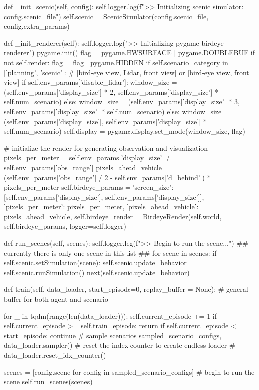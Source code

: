 \begin{appendix}
def \_init\_scenic(self, config):
self.logger.log(f">> Initializing scenic simulator: {config.scenic\_file}")
self.scenic = ScenicSimulator(config.scenic\_file, config.extra\_params)

def \_init\_renderer(self):
self.logger.log(">> Initializing pygame birdeye renderer")
pygame.init()
flag = pygame.HWSURFACE | pygame.DOUBLEBUF
if not self.render:
flag = flag | pygame.HIDDEN
if self.scenario\_category in ['planning', 'scenic']: 
\# [bird-eye view, Lidar, front view] or [bird-eye view, front view]
if self.env\_params['disable\_lidar']:
window\_size = (self.env\_params['display\_size'] * 2, self.env\_params['display\_size'] * self.num\_scenario)
else:
window\_size = (self.env\_params['display\_size'] * 3, self.env\_params['display\_size'] * self.num\_scenario)
else:
window\_size = (self.env\_params['display\_size'], self.env\_params['display\_size'] * self.num\_scenario)
self.display = pygame.display.set\_mode(window\_size, flag)

\# initialize the render for generating observation and visualization
pixels\_per\_meter = self.env\_params['display\_size'] / self.env\_params['obs\_range']
pixels\_ahead\_vehicle = (self.env\_params['obs\_range'] / 2 - self.env\_params['d\_behind']) * pixels\_per\_meter
self.birdeye\_params = {
	'screen\_size': [self.env\_params['display\_size'], self.env\_params['display\_size']],
	'pixels\_per\_meter': pixels\_per\_meter,
	'pixels\_ahead\_vehicle': pixels\_ahead\_vehicle,
}
self.birdeye\_render = BirdeyeRender(self.world, self.birdeye\_params, logger=self.logger)

def run\_scenes(self, scenes):
self.logger.log(f">> Begin to run the scene...")
\#\# currently there is only one scene in this list \#\#
for scene in scenes:
if self.scenic.setSimulation(scene):
self.scenic.update\_behavior = self.scenic.runSimulation()
next(self.scenic.update\_behavior)

def train(self, data\_loader, start\_episode=0, replay\_buffer = None):
\# general buffer for both agent and scenario

for \_ in tqdm(range(len(data\_loader))):
self.current\_episode += 1
if self.current\_episode >= self.train\_episode:
return
if self.current\_episode < start\_episode:
continue
\# sample scenarios
sampled\_scenario\_configs, \_ = data\_loader.sampler()
\# reset the index counter to create endless loader
\# data\_loader.reset\_idx\_counter()

scenes = [config.scene for config in sampled\_scenario\_configs]
\# begin to run the scene
self.run\_scenes(scenes)


\end{appendix}
